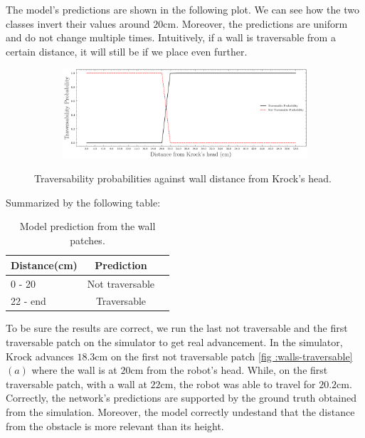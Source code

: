     The model's predictions are shown in the following plot. We can see how the two classes invert their values around $20$cm. Moreover, the predictions are uniform and do not change multiple times. Intuitively, if a wall is traversable from a certain distance, it will still be if we place even further.
\begin{figure}[H]
    \centering
\begin{subfigure}[b]{1\textwidth}
    \includegraphics[width=\linewidth]{../img/5/custom_patches/walls_front/predictions.png}
    \end{subfigure}
    \caption{Traversability probabilities against wall distance from Krock's head.}
\end{figure}
Summarized by the following table:
\begin{table}[H]
    \centering
    \begin{tabular}{l|cc}
        Distance(cm) & Prediction \\ 
        \hline
        0 - 20  & Not traversable \\ 
        22 - end & Traversable \\ 
        \hline
    \end{tabular}
    \caption{Model prediction from the wall patches.}
\end{table}
To be sure the results are correct, we run the last not traversable  and the first traversable patch on the simulator to get real advancement. In the simulator, Krock advances $18.3$cm on the first not traversable patch \ref{fig :walls-traversable} $(a)$ where the wall is at $20$cm from the robot's head. While, on the first traversable patch, with a wall at $22$cm, the robot was able to travel for $20.2$cm. Correctly, the network's predictions are supported by the ground truth obtained from the simulation. Moreover, the model correctly undestand that the distance from the obstacle is more relevant than its height.
